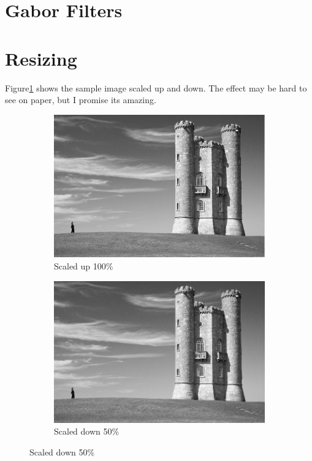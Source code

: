 \documentclass[12pt]{article}
\begin{document}
\section{Gabor Filters}

\section{Resizing}

Figure\ref{fig_scale} shows the sample image scaled up and down. The effect may be hard to see on paper, but I promise its amazing.

\begin{figure}
    \begin{subfigure}[t]{.49\textwidth}
        \centering
        \includegraphics[width=\linewidth]{resize_double}
        \caption{Scaled up 100\%}
    \end{subfigure}\hfill
    \begin{subfigure}[t]{.49\textwidth}
        \centering
        \includegraphics[width=\linewidth]{resize_half}
        \caption{Scaled down 50\%}
    \end{subfigure}
    \label{fig_scale}
\end{figure}
\end{document}

